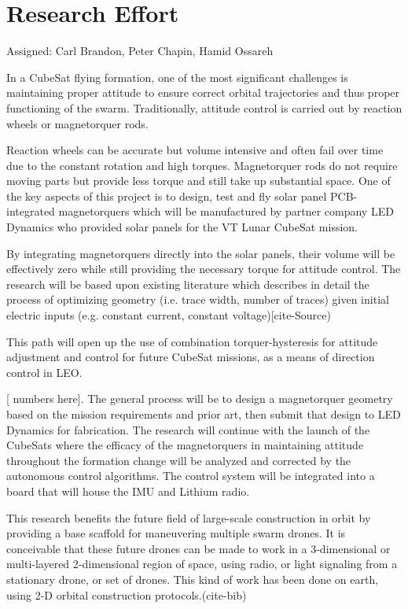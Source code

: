\section{Research Effort}
Assigned: Carl Brandon, Peter Chapin, Hamid Ossareh

In a CubeSat flying formation, one of the most significant challenges
is maintaining proper attitude to ensure correct orbital trajectories
and thus proper functioning of the swarm. Traditionally, attitude
control is carried out by reaction wheels or magnetorquer
rods.

Reaction wheels can be accurate but volume intensive and often
fail over time due to the constant rotation and high
torques. Magnetorquer rods do not require moving parts but provide
less torque and still take up substantial space. One of the key
aspects of this project is to design, test and fly solar panel
PCB-integrated magnetorquers which will be manufactured by partner
company LED Dynamics who provided solar panels for the VT Lunar
CubeSat mission.

By integrating magnetorquers directly into the solar panels, their
volume will be effectively zero while still providing the necessary
torque for attitude control. The research will be based upon existing
literature which describes in detail the process of optimizing
geometry (i.e. trace width, number of traces) given initial electric
inputs (e.g. constant current, constant voltage)[cite-Source)

This path will open up the use of combination torquer-hysteresis for
attitude adjustment and control for future CubeSat missions, as a
means of direction control in LEO.

[ numbers here]. The general process will be to design a magnetorquer
geometry based on the mission requirements and prior art, then submit
that design to LED Dynamics for fabrication. The research will
continue with the launch of the CubeSats where the efficacy of the
magnetorquers in maintaining attitude throughout the formation change
will be analyzed and corrected by the autonomous control
algorithms. The control system will be integrated into a board that
will house the IMU and Lithium radio.

This research benefits the future field of large-scale construction in
orbit by providing a base scaffold for maneuvering multiple swarm
drones. It is conceivable that these future drones can be made to work
in a 3-dimensional or multi-layered 2-dimensional region of space,
using radio, or light signaling from a stationary drone, or set of
drones. This kind of work has been done on earth, using 2-D orbital
construction protocols.(cite-bib)

